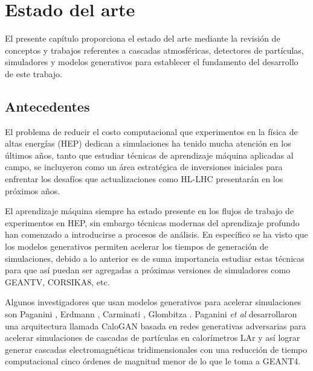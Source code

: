 
\chapter{Estado del arte} %

\label{Chapter2} %

El presente capítulo proporciona el estado del arte mediante la revisión de conceptos y trabajos referentes a cascadas atmosféricas, detectores de partículas, simuladores y modelos generativos para establecer el fundamento del desarrollo de este trabajo. 

\section{Antecedentes}

El problema de reducir el costo computacional que experimentos en la física de altas energías (HEP) dedican a simulaciones ha tenido mucha atención en los últimos años, tanto que estudiar técnicas de aprendizaje máquina aplicadas al campo, se incluyeron como un área estratégica de inversiones iniciales para enfrentar los desafíos que actualizaciones como HL-LHC presentarán en los próximos años. 

El aprendizaje máquina siempre ha estado presente en los flujos de trabajo de experimentos en HEP, sin embargo técnicas modernas del aprendizaje profundo han comenzado a introducirse a procesos de análisis. En específico se ha visto que los modelos generativos permiten acelerar los tiempos de generación de simulaciones, debido a lo anterior es de suma importancia estudiar estas técnicas para que así puedan ser agregadas a próximas versiones de simuladores como GEANTV, CORSIKA8, etc.

Algunos investigadores que usan modelos generativos para acelerar simulaciones son Paganini \parencite{Paganini2017,Paganini2017b}, Erdmann \parencite{Erdmann2019,Erdmann2018}, Carminati \parencite{Carminati2018,Carminati2020}, Glombitza \parencite{Glombitza2020,Erdmann2018b}.
Paganini \emph{et al} desarrollaron una arquitectura llamada CaloGAN basada en redes generativas adversarias para acelerar simulaciones de cascadas de partículas en calorímetros LAr y así lograr generar cascadas electromagnéticas tridimensionales con una reducción de tiempo computacional cinco órdenes de magnitud menor de lo que le toma a GEANT4.

